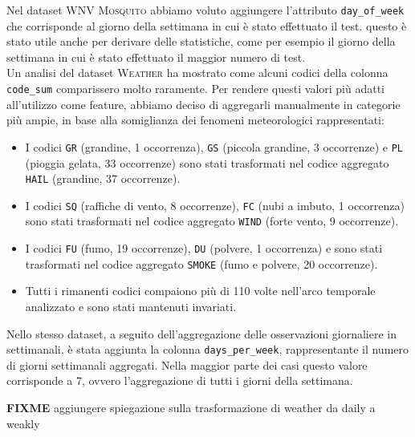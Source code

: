 Nel dataset \textsc{WNV Mosquito} abbiamo voluto aggiungere l'attributo 
\texttt{day\_of\_week} che corrisponde al giorno della settimana in cui è stato 
effettuato il test. questo è stato utile anche per derivare delle statistiche, 
come per esempio il giorno della settimana in cui è stato effettuato il maggior 
numero di test. 
\\

Un analisi del dataset \textsc{Weather} ha mostrato come alcuni codici della 
colonna \texttt{code\_sum} comparissero molto raramente. Per rendere questi 
valori più adatti all'utilizzo come feature, abbiamo deciso di aggregarli 
manualmente in categorie più ampie, in base alla somiglianza dei fenomeni 
meteorologici rappresentati:
\begin{itemize}
	\item I codici \texttt{GR} (grandine, 1 occorrenza), \texttt{GS} (piccola 
	grandine, 3 occorrenze) e \texttt{PL} (pioggia gelata, 33 occorrenze) sono 
	stati trasformati nel codice aggregato \texttt{HAIL} (grandine, 37 
	occorrenze).
	
	\item I codici \texttt{SQ} (raffiche di vento, 8 occorrenze), \texttt{FC} 
	(nubi a imbuto, 1 occorrenza) sono stati trasformati nel codice aggregato 
	\texttt{WIND} (forte vento, 9 occorrenze).
	
	\item I codici \texttt{FU} (fumo, 19 occorrenze), \texttt{DU} (polvere, 1 
	occorrenza) e sono stati trasformati nel codice aggregato \texttt{SMOKE} 
	(fumo e polvere, 20 occorrenze).
	
	\item Tutti i rimanenti codici compaiono più di 110 volte nell'arco 
	temporale analizzato e sono stati mantenuti invariati.
\end{itemize}

Nello stesso dataset, a seguito dell'aggregazione delle osservazioni 
giornaliere in settimanali, è stata aggiunta la colonna 
\texttt{days\_per\_week}, rappresentante il numero di giorni settimanali 
aggregati. Nella maggior parte dei casi questo valore corrisponde a 7, ovvero 
l'aggregazione di tutti i giorni della settimana.

\textbf{FIXME} aggiungere spiegazione sulla trasformazione di weather da daily 
a weakly
